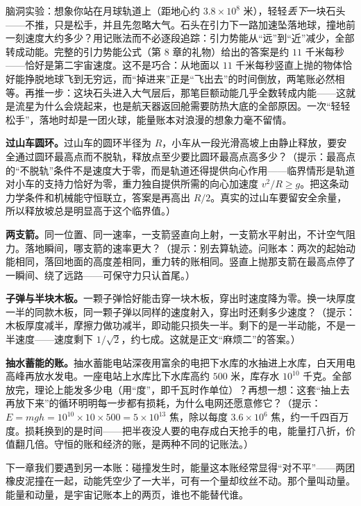 \begin{thought}[从月亮上扔一块石头]
脑洞实验：想象你站在月球轨道上（距地心约 \(3.8\times10^{8}\) 米），轻轻\emph{丢下}一块石头——不推，只是松手，并且先忽略大气。石头在引力下一路加速坠落地球，撞地前一刻速度大约多少？用记账法而不必逐段追踪：引力势能从“远”到“近”减少，全部转成动能。完整的引力势能公式（第 8 章的礼物）给出的答案是约 \(11\) 千米每秒——恰好是第二宇宙速度。这不是巧合：从地面以 \(11\) 千米每秒竖直上抛的物体恰好能挣脱地球飞到无穷远，而“掉进来”正是“飞出去”的时间倒放，两笔账必然相等。再推一步：这块石头进入大气层后，那笔巨额动能几乎全数转成内能——这就是流星为什么会烧起来，也是航天器返回舱需要防热大底的全部原因。一次“轻轻松手”，落地时却是一团火球，能量账本对浪漫的想象力毫不留情。
\end{thought}

\begin{puzzles}
\item \textbf{过山车圆环。}过山车的圆环半径为 \(R\)，小车从一段光滑高坡上由静止释放，要安全通过圆环最高点而不脱轨，释放点至少要比圆环最高点高多少？（提示：最高点的“不脱轨”条件不是速度大于零，而是轨道还得提供向心作用——临界情形是轨道对小车的支持力恰好为零，重力独自提供所需的向心加速度 \(v^{2}/R\geq g\)。把这条动力学条件和机械能守恒联立，答案是再高出 \(R/2\)。真实的过山车要留安全余量，所以释放坡总是明显高于这个临界值。）
\item \textbf{两支箭。}同一位置、同一速率，一支箭竖直向上射，一支箭水平射出，不计空气阻力。落地瞬间，哪支箭的速率更大？（提示：别去算轨迹。问账本：两次的起始动能相同，落回地面的高度差相同，重力转的账相同。竖直上抛那支箭在最高点停了一瞬间、绕了远路——可保守力只认首尾。）
\item \textbf{子弹与半块木板。}一颗子弹恰好能击穿一块木板，穿出时速度降为零。换一块厚度一半的同款木板，同一颗子弹以同样的速度射入，穿出时还剩多少速度？（提示：木板厚度减半，摩擦力做功减半，即动能只损失一半。剩下的是一半动能，不是一半速度——速度剩下 \(1/\sqrt{2}\)，约七成。这就是正文“麻烦二”的答案。）
\item \textbf{抽水蓄能的账。}抽水蓄能电站深夜用富余的电把下水库的水抽进上水库，白天用电高峰再放水发电。一座电站上水库比下水库高约 \(500\) 米，库存水 \(10^{10}\) 千克。全部放完，理论上能发多少电（用“度”，即千瓦时作单位）？再想一想：这套“抽上去再放下来”的循环明明每一步都有损耗，为什么电网还愿意修它？（提示：\(E=mgh=10^{10}\times10\times500=5\times10^{13}\) 焦，除以每度 \(3.6\times10^{6}\) 焦，约一千四百万度。损耗换到的是时间——把半夜没人要的电存成白天抢手的电，能量打八折，价值翻几倍。守恒的账和经济的账，是两种不同的记账法。）
\end{puzzles}

下一章我们要遇到另一本账：碰撞发生时，能量这本账经常显得“对不平”——两团橡皮泥撞在一起，动能凭空少了一大半，可有一个量却纹丝不动。那个量叫动量。能量和动量，是宇宙记账本上的两页，谁也不能替代谁。
